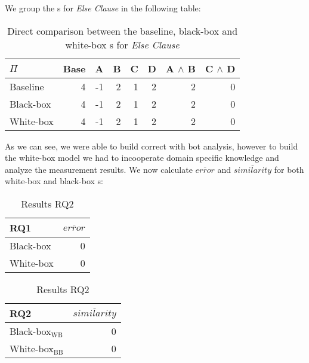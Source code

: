 We group the {\perfInfluenceModel}s for \emph{Else Clause} in the following table:

\begin{table}[H]
    \centering
    \begin{tabular}{lrrrrrrr}
    \toprule
    $\Pi$    & Base & A & B & C & D & A $\land$ B & C $\land$ D  \\ \midrule
    Baseline & 4    & -1 & 2 & 1 & 2 & 2           & 0            \\
    Black-box & 4    & -1 & 2 & 1 & 2 & 2           & 0           \\
    White-box & 4    & -1 & 2 & 1 & 2 & 2           & 0           \\ \bottomrule
    \end{tabular}  
    \caption{Direct comparison between the baseline, black-box and white-box {\perfInfluenceModel}s for \emph{Else Clause}}\label{aggr:results-else-clause}
\end{table}

As we can see, we were able to build correct {\perfInfluenceModel} with bot analysis, however to build the white-box model we had to
incooperate domain specific knowledge and analyze the measurement results. We now calculate $\overline{error}$ and $\overline{similarity}$
for both white-box and black-box {\perfInfluenceModel}s:


\begin{table}[H]
    \begin{minipage}{.5\linewidth}
        \centering
        \begin{tabular}{lr}
        \toprule
        RQ1     & $\overline{error}$         \\ \midrule
        Black-box & 0              \\
        White-box & 0              \\ \bottomrule
        \end{tabular}  
        \caption{Results RQ1}
    \end{minipage}%
    \begin{minipage}{.5\linewidth}
        \centering
        \begin{tabular}{lr}
            \toprule
            RQ2     & $\overline{similarity}$   \\ \midrule
            Black-box$_\text{WB}$ & 0              \\
            White-box$_\text{BB}$ & 0              \\ \bottomrule
            \end{tabular}  
            \caption{Results RQ2}
    \end{minipage} 
    \end{table}

